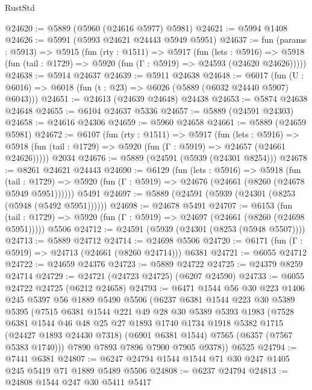 \begin{lexlean}{RustStd}
\begin{coremodule}
@24620 := @5889 (@5960 (@24616 @5977) @5981)
@24621 := @5994 @1408
@24626 := @5991 (@5993 @24621 @24443 @5949 @5951)
@24637 := fun (params : @5913) =>
  @5915
    (fun (rty : @1511) =>
    @5917
      (fun (lets : @5916) =>
      @5918 (fun (tail : @1729) => @5920 (fun (Γ : @5919) => @24593 (@24620 @24626)))))
@24638 := @5914 @24637
@24639 := @5911 @24638
@24648 := @6017
    (fun (U : @6016) => @6018 (fun (t : @23) => @6026 (@5889 (@6032 @24440 @5907) @6043)))
@24651 := @24613 (@24639 @24648) @24438
@24653 := @5874 @24638 @24648
@24655 := @6104 @24637 @5336
@24657 := @5889 (@24591 @24303)
@24658 := @24616 @24306
@24659 := @5960 @24658
@24661 := @5889 (@24659 @5981)
@24672 := @6107
    (fun (rty : @1511) =>
    @5917
      (fun (lets : @5916) =>
      @5918 (fun (tail : @1729) => @5920 (fun (Γ : @5919) => @24657 (@24661 @24626)))))
    @2034
@24676 := @5889 (@24591 (@5939 (@24301 @8254)))
@24678 := @8261 @24621 @24443
@24690 := @6129
    (fun (lets : @5916) =>
    @5918
      (fun (tail : @1729) =>
      @5920 (fun (Γ : @5919) => @24676 (@24661 (@8260 (@24678 @5949 @5951))))))
    @5491
@24697 := @5889 (@24591 (@5939 (@24301 (@8253 (@5948 (@5492 @5951))))))
@24698 := @24678 @5491
@24707 := @6153
    (fun (tail : @1729) => @5920 (fun (Γ : @5919) => @24697 (@24661 (@8260 (@24698 @5951)))))
    @5506
@24712 := @24591 (@5939 (@24301 (@8253 (@5948 @5507))))
@24713 := @5889 @24712
@24714 := @24698 @5506
@24720 := @6171 (fun (Γ : @5919) => @24713 (@24661 (@8260 @24714))) @6381
@24721 := @6055 @24712
@24722 := @24659 @24376
@24723 := @5889 @24722
@24725 := @24379 @8259 @24714
@24729 := @24721 (@24723 @24725) (@6207 @24590)
@24733 := @6055 @24722 @24725 (@6212 @24658)
@24793 := @6471
    @1544
    @56
    @30
    @223
    @1406
    @245
    @5397
    @56
    @1889
    @5490
    @5506
    (@6237
      @6381
      @1544
      @223
      @30
      @5389
      @5395
      (@7515
        @6381
        @1544
        @221
        @49
        @28
        @30
        @5389
        @5393
        @1983
        (@7528
          @6381
          @1544
          @46
          @48
          @25
          @27
          @1893
          @1740
          @1734
          @1918
          @5382
          @1715
          (@24427 @1893 @24430 @7318)
          (@6901 @6381 @1544)
          @7565
          (@6357 (@7567 @5383 @1740)))
        @7890
        @7893
        @7896
        @7900
        @7905
        @9378))
    @6525
@24794 := @7441 @6381
@24807 := @6247 @24794 @1544 @1544 @71 @30 @247 @1405 @245 @5419 @71 @1889 @5489 @5506
@24808 := @6237 @24794
@24813 := @24808 @1544 @247 @30 @5411 @5417

\end{coremodule}
\end{lexlean}
